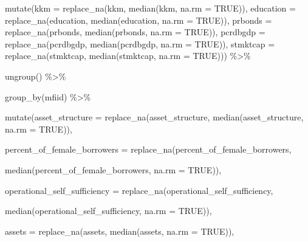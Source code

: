 \documentclass[a4paper,nobind]{templates/ociamthesis}
\newenvironment{Shaded}{\begin{snugshade}}{\end{snugshade}}
\newcommand{\AttributeTok}[1]{\textcolor[rgb]{0.77,0.63,0.00}{#1}}
\newcommand{\ConstantTok}[1]{\textcolor[rgb]{0.00,0.00,0.00}{#1}}
\newcommand{\FunctionTok}[1]{\textcolor[rgb]{0.00,0.00,0.00}{#1}}
\newcommand{\NormalTok}[1]{#1}
\newcommand{\SpecialCharTok}[1]{\textcolor[rgb]{0.00,0.00,0.00}{#1}}
\renewenvironment{Shaded}
{
  \vspace{10pt}%
  \begin{snugshade}%
}{%
  \end{snugshade}%
  \vspace{8pt}%
}
\begin{document}
\begin{Shaded}
\begin{Highlighting}[]
  \FunctionTok{mutate}\NormalTok{(}\AttributeTok{kkm =} \FunctionTok{replace\_na}\NormalTok{(kkm, }\FunctionTok{median}\NormalTok{(kkm, }\AttributeTok{na.rm =} \ConstantTok{TRUE}\NormalTok{)),}
         \AttributeTok{education =} \FunctionTok{replace\_na}\NormalTok{(education, }\FunctionTok{median}\NormalTok{(education, }\AttributeTok{na.rm =} \ConstantTok{TRUE}\NormalTok{)),}
         \AttributeTok{prbonds =} \FunctionTok{replace\_na}\NormalTok{(prbonds, }\FunctionTok{median}\NormalTok{(prbonds, }\AttributeTok{na.rm =} \ConstantTok{TRUE}\NormalTok{)),}
         \AttributeTok{pcrdbgdp =} \FunctionTok{replace\_na}\NormalTok{(pcrdbgdp, }\FunctionTok{median}\NormalTok{(pcrdbgdp, }\AttributeTok{na.rm =} \ConstantTok{TRUE}\NormalTok{)),}
         \AttributeTok{stmktcap =} \FunctionTok{replace\_na}\NormalTok{(stmktcap, }\FunctionTok{median}\NormalTok{(stmktcap, }\AttributeTok{na.rm =} \ConstantTok{TRUE}\NormalTok{))) }\SpecialCharTok{\%\textgreater{}\%} 
  
  \FunctionTok{ungroup}\NormalTok{() }\SpecialCharTok{\%\textgreater{}\%} 
  
  \FunctionTok{group\_by}\NormalTok{(mfiid) }\SpecialCharTok{\%\textgreater{}\%} 
  
  \FunctionTok{mutate}\NormalTok{(}\AttributeTok{asset\_structure =} \FunctionTok{replace\_na}\NormalTok{(asset\_structure, }\FunctionTok{median}\NormalTok{(asset\_structure, }\AttributeTok{na.rm =} \ConstantTok{TRUE}\NormalTok{)), }
         
         \AttributeTok{percent\_of\_female\_borrowers =} \FunctionTok{replace\_na}\NormalTok{(percent\_of\_female\_borrowers, }
                                                  
                                                  \FunctionTok{median}\NormalTok{(percent\_of\_female\_borrowers, }\AttributeTok{na.rm =} \ConstantTok{TRUE}\NormalTok{)),}
         
         \AttributeTok{operational\_self\_sufficiency =} \FunctionTok{replace\_na}\NormalTok{(operational\_self\_sufficiency, }
                                                   
                                                   \FunctionTok{median}\NormalTok{(operational\_self\_sufficiency, }\AttributeTok{na.rm =} \ConstantTok{TRUE}\NormalTok{)),}
         
         \AttributeTok{assets =} \FunctionTok{replace\_na}\NormalTok{(assets, }\FunctionTok{median}\NormalTok{(assets, }\AttributeTok{na.rm =} \ConstantTok{TRUE}\NormalTok{)),}
         

\end{Highlighting}
\end{Shaded}
\end{document}

